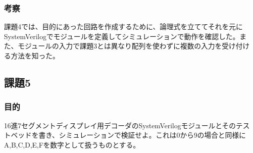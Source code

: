 \documentclass[a4paper]{jarticle}
\begin{document}
\subsubsection{考察}
課題4では、目的にあった回路を作成するために、論理式を立ててそれを元にSystemVerilogでモジュールを定義してシミュレーションで動作を確認した。また、モジュールの入力で課題3とは異なり配列を使わずに複数の入力を受け付ける方法を知った。
\subsection{課題5}
\subsubsection{目的}
16進7セグメントディスプレイ用デコーダのSystemVerilogモジュールとそのテストベッドを書き、シミュレーションで検証せよ。これは0から9の場合と同様にA,B,C,D,E,Fを数字として扱うものとする。
\end{document}
